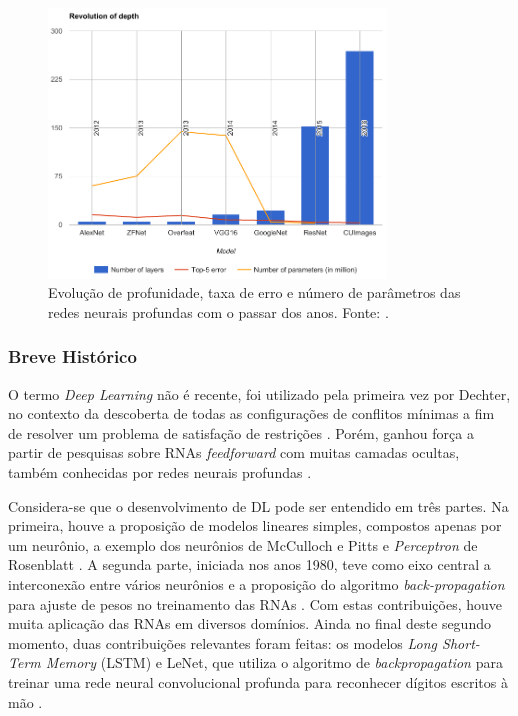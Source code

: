 \begin{figure}[ht]
	\centering
	\caption{Evolução de profunidade, taxa de erro e número de parâmetros das redes neurais profundas com o passar dos anos. Fonte: \cite{mediumcnn}.}
	\label{fig:compara_redes}
	\includegraphics[width=0.8\textwidth]{img/compara_redes.png}
\end{figure}

\subsubsection{Breve Histórico}

O termo \emph{Deep Learning} não é recente, foi utilizado pela primeira vez por Dechter, no contexto da descoberta de todas as configurações de conflitos mínimas a fim de resolver um problema de satisfação de restrições
\cite{dechter1986learning}. Porém, ganhou força a partir de pesquisas sobre RNAs \emph{feedforward} com muitas camadas ocultas, também conhecidas por redes neurais profundas \cite{deng2014deep}.

Considera-se que o desenvolvimento de DL pode ser entendido em três partes. Na primeira, houve a proposição de modelos lineares simples, compostos apenas por um neurônio, a exemplo dos neurônios de McCulloch e Pitts \cite{mcculloch1943logical} e \emph{Perceptron} de Rosenblatt  \cite{rosenblatt1958perceptron}. A segunda parte, iniciada nos anos 1980, teve como eixo central a interconexão entre vários neurônios e a proposição do algoritmo \emph{back-propagation} para ajuste de pesos no treinamento das RNAs  \cite{rumelhart1986parallel,rumelhart1986backpropagation}. Com estas contribuições, houve muita aplicação das RNAs em diversos domínios. Ainda no final deste segundo momento, duas contribuições relevantes foram feitas: os modelos \emph{Long Short-Term Memory} (LSTM) e LeNet, que utiliza o algoritmo de \emph{backpropagation} para treinar uma rede neural convolucional profunda para reconhecer dígitos escritos à mão
\cite{lenet}.

